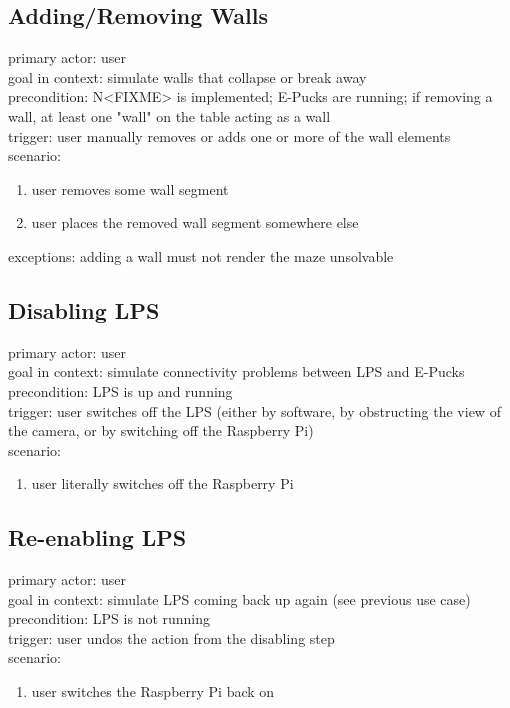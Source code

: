 \documentclass[a4paper,parskip,headheight=38pt]{scrartcl} %
\begin{document}
\subsection{Adding/Removing Walls}
primary actor: user \\
goal in context: simulate walls that collapse or break away \\
precondition: N<FIXME> is implemented; E-Pucks are running; if removing a wall, at least one "wall" on the table acting as a wall \\
trigger: user manually removes or adds one or more of the wall elements \\
scenario: 
\begin{enumerate}[label={\arabic*.}]
	\item user removes some wall segment 
	\item user places the removed wall segment somewhere else 
\end{enumerate}
exceptions: adding a wall must not render the maze unsolvable \\

\subsection{Disabling LPS}
primary actor: user \\
goal in context: simulate connectivity problems between LPS and E-Pucks \\
precondition: LPS is up and running \\
trigger: user switches off the LPS (either by software, by obstructing the view of the camera, or by switching off the Raspberry Pi) \\
scenario: 
\begin{enumerate}[label={\arabic*.}]
	\item user literally switches off the Raspberry Pi 
\end{enumerate}

\subsection{Re-enabling LPS}
primary actor: user \\
goal in context: simulate LPS coming back up again (see previous use case) \\
precondition: LPS is not running \\
trigger: user undos the action from the disabling step \\
scenario: 
\begin{enumerate}[label={\arabic*.}]
	\item user switches the Raspberry Pi back on 
\end{enumerate}
\end{document}
